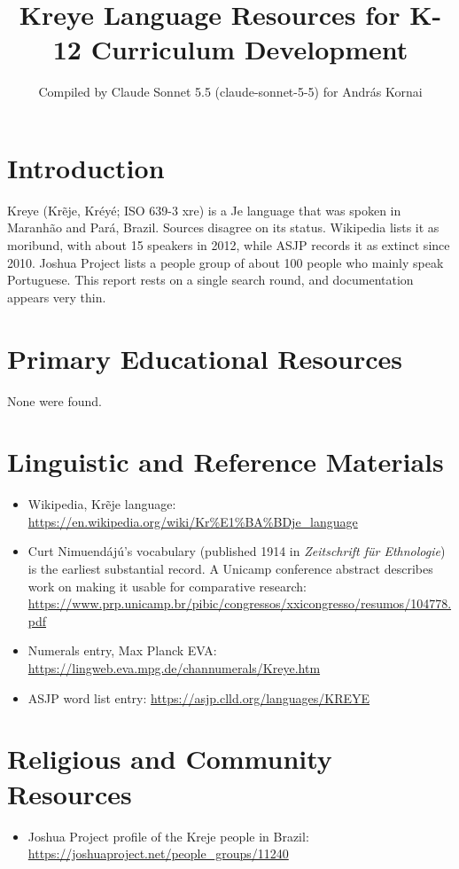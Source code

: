 \documentclass[12pt]{article}
\title{Kreye Language Resources for K-12 Curriculum Development}
\author{Compiled by Claude Sonnet 5.5 (claude-sonnet-5-5) for Andr\'as Kornai}
\date{}
\begin{document}
\maketitle

\section{Introduction}
Kreye (Kr\~eje, Kr\'ey\'e; ISO 639-3 xre) is a Je language that was spoken in Maranh\~ao and Par\'a, Brazil. Sources disagree on its status. Wikipedia lists it as moribund, with about 15 speakers in 2012, while ASJP records it as extinct since 2010. Joshua Project lists a people group of about 100 people who mainly speak Portuguese. This report rests on a single search round, and documentation appears very thin.

\section{Primary Educational Resources}
None were found.

\section{Linguistic and Reference Materials}
\begin{itemize}
\item Wikipedia, Kr\~eje language: \url{https://en.wikipedia.org/wiki/Kr%E1%BA%BDje_language}
\item Curt Nimuend\'aj\'u's vocabulary (published 1914 in \textit{Zeitschrift f\"ur Ethnologie}) is the earliest substantial record. A Unicamp conference abstract describes work on making it usable for comparative research: \url{https://www.prp.unicamp.br/pibic/congressos/xxicongresso/resumos/104778.pdf}
\item Numerals entry, Max Planck EVA: \url{https://lingweb.eva.mpg.de/channumerals/Kreye.htm}
\item ASJP word list entry: \url{https://asjp.clld.org/languages/KREYE}
\end{itemize}

\section{Religious and Community Resources}
\begin{itemize}
\item Joshua Project profile of the Kreje people in Brazil: \url{https://joshuaproject.net/people_groups/11240}
\end{itemize}
\end{document}
